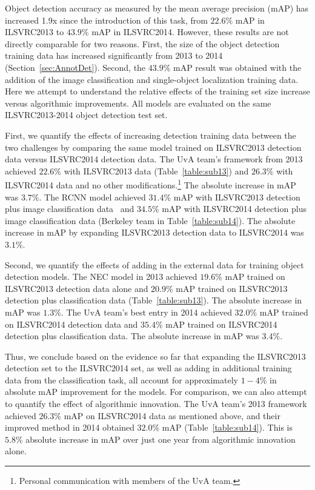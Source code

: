 Object detection accuracy as measured by the mean average precision (mAP) has increased 1.9x since the introduction of this task, from $22.6\%$ mAP in ILSVRC2013 to $43.9\%$ mAP in ILSVRC2014. However, these results are not directly comparable for two reasons. First, the size of the object detection training data has increased significantly from 2013 to 2014 (Section~\ref{sec:AnnotDet}). 
Second, the $43.9\%$ mAP result was obtained with the addition of the image classification and single-object localization training data. Here we attempt to understand the relative effects of the training set size increase versus algorithmic improvements. All models are evaluated on the same ILSVRC2013-2014 object detection test set.

First, we quantify the effects of increasing detection training data between the two challenges by comparing the same model trained on ILSVRC2013 detection data versus ILSVRC2014 detection data.  The UvA team's framework from 2013 achieved $22.6\%$ with ILSVRC2013 data  (Table~\ref{table:sub13}) and $26.3\%$ with ILSVRC2014 data and no other modifications.\footnote{Personal communication with members of the UvA team.} The absolute increase in mAP was $3.7\%$.
The RCNN model  achieved $31.4\%$ mAP with ILSVRC2013 detection plus image classification data~\citep{Girshick13} and $34.5\%$ mAP with ILSVRC2014 detection plus image classification data (Berkeley team in Table~\ref{table:sub14}). The absolute increase in mAP by expanding ILSVRC2013 detection data to ILSVRC2014 was $3.1\%$. 

Second, we quantify the effects of adding in the external data for training object detection models. The NEC model in 2013 achieved $19.6\%$ mAP trained on ILSVRC2013 detection data alone and $20.9\%$ mAP trained on ILSVRC2013 detection plus classification data (Table~\ref{table:sub13}). The absolute increase in mAP was $1.3\%$. The UvA team's best entry in 2014 achieved $32.0\%$ mAP trained on ILSVRC2014 detection data and  $35.4\%$ mAP trained on ILSVRC2014 detection plus classification data. The absolute increase in mAP was $3.4\%$. 

Thus, we conclude based on the evidence so far that expanding the ILSVRC2013 detection set to the ILSVRC2014 set, as well as adding in additional training data from the classification task, all account for approximately $1-4\%$ in absolute mAP improvement for the models. For comparison, we can also attempt to quantify the effect of algorithmic innovation. The UvA team's 2013 framework achieved $26.3\%$ mAP on ILSVRC2014 data as mentioned above, and their improved method in 2014 obtained $32.0\%$ mAP (Table~\ref{table:sub14}). This is $5.8\%$ absolute increase in mAP over just one year from algorithmic innovation alone. 

